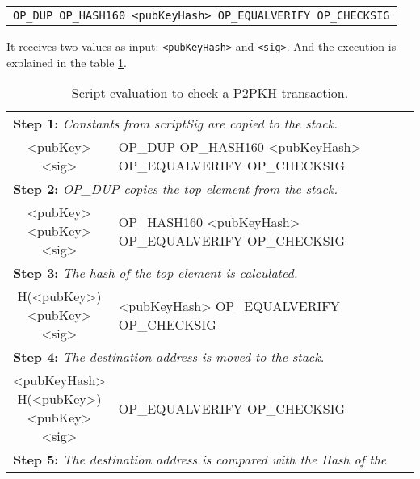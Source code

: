 \begin{center}
  \begin{tabular}{|c|}
    \texttt{OP\_DUP OP\_HASH160 <pubKeyHash> OP\_EQUALVERIFY OP\_CHECKSIG}
  \end{tabular}
\end{center}

  It receives two values as input:  \lstinline{<pubKeyHash>} and
  \lstinline{<sig>}. And the execution is explained in the table%
    \ref{tab:p2pkh_exec}.

\begin{table}[tbp]
  \small
    \caption{Script evaluation to check a P2PKH transaction.}
    \label{tab:p2pkh_exec}
    \begin{tabularx}{\textwidth}{| c | X |}
    \hline
	    \thead{Stack} & \thead{Script} \\
	\hline
      \multicolumn{2}{|l|}{\textbf{Step 1: }\textit{%
          Constants from scriptSig are copied to the stack.}} \\
    \hline
	  \makecell{<pubKey>\\<sig>} & OP\_DUP \footnotesize{%
          OP\_HASH160 <pubKeyHash> OP\_EQUALVERIFY OP\_CHECKSIG} \\
    \hline
	  \multicolumn{2}{|l|}{\textbf{Step 2: }\textit{%
	      OP\_DUP copies the top element from the stack.}} \\
    \hline
      \makecell{<pubKey> \\ <pubKey> \\ <sig>} & OP\_HASH160 \footnotesize{%
          <pubKeyHash> OP\_EQUALVERIFY OP\_CHECKSIG} \\
	\hline
      \multicolumn{2}{|l|}{\textbf{Step 3: }\textit{%
          The hash of the top element is calculated.}} \\
    \hline
	  \makecell{H(<pubKey>) \\ <pubKey> \\ <sig>} & <pubKeyHash> \footnotesize{%
          OP\_EQUALVERIFY OP\_CHECKSIG} \\
    \hline
	  \multicolumn{2}{|l|}{\textbf{Step 4: }\textit{%
	      The destination address is moved to the stack.}} \\
	\hline
	  \makecell{<pubKeyHash> \\ H(<pubKey>) \\ <pubKey> \\ <sig>} &%
	      OP\_EQUALVERIFY \footnotesize{OP\_CHECKSIG} \\
	\hline
	  \multicolumn{2}{|l|}{\textbf{Step 5: }\textit{%
	      The destination address is compared with the Hash of the %
}}
\end{tabularx}
\end{table}
